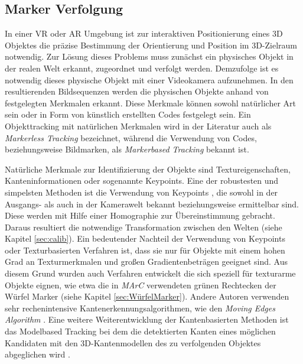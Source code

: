 \subsection{Marker Verfolgung} \label{sec:MarkerTracking}
In einer VR oder AR Umgebung ist zur interaktiven Positionierung eines 3D Objektes die präzise Bestimmung der Orientierung und Position im 3D-Zielraum notwendig. Zur Lösung dieses Problems muss zunächst ein physisches Objekt in der realen Welt erkannt, zugeordnet und verfolgt werden. Demzufolge ist es notwendig dieses physische Objekt mit einer Videokamera aufzunehmen. In den resultierenden Bildsequenzen werden die physischen Objekte anhand von festgelegten Merkmalen erkannt. Diese Merkmale können sowohl natürlicher Art sein oder in Form von künstlich erstellten Codes festgelegt sein. Ein Objekttracking mit natürlichen Merkmalen wird in der Literatur auch als \textit{Markerless Tracking} bezeichnet, während die Verwendung von Codes, beziehungsweise Bildmarken, als \textit{Markerbased Tracking} bekannt ist.

Natürliche Merkmale zur Identifizierung der Objekte sind Textureigenschaften, Kanteninformationen oder sogenannte Keypoints. Eine der robustesten und simpelsten Methoden ist die Verwendung von Keypoints \cite{article:MarkerLessBarandiaran2010}\cite{article:MarkerLessWagner:}\cite{article:MarkerLessComport}\cite{article:MarkerLessLowe}, die sowohl in der Ausgangs- als auch in der Kamerawelt bekannt beziehungsweise ermittelbar sind. Diese werden mit Hilfe einer Homographie zur Übereinstimmung gebracht. Daraus resultiert die notwendige Transformation zwischen den Welten (siehe Kapitel \ref{sec:calib}). Ein bedeutender Nachteil der Verwendung von Keypoints oder Texturbasierten Verfahren ist, dass sie nur für Objekte mit einem hohen Grad an Texturmerkmalen und großen Gradientenbeträgen geeignet sind. Aus diesem Grund wurden auch Verfahren \cite{article:MarkerLessStrucktHinterstoisser}\cite{article:MarkerLessStrucktDamen}\cite{article:MarkerLessStrucktPark} entwickelt die sich speziell für texturarme Objekte eignen, wie etwa die in \textit{MArC} verwendeten grünen Rechtecken der Würfel Marker (siehe Kapitel \ref{sec:WürfelMarker}). Andere Autoren verwenden sehr rechenintensive Kantenerkennungsalgorithmen, wie den \textit{Moving Edges Algorithm} \cite{article:MarkerLessEdgeMarchand}. Eine weitere Weiterentwicklung der Kantenbasierten Methoden ist das Modelbased Tracking bei dem die detektierten Kanten eines möglichen Kandidaten mit den 3D-Kantenmodellen des zu verfolgenden Objektes abgeglichen wird \cite{article:MarkerLessModellVacchetti}\cite{article:MarkerLessEdgeAlvarez}\cite{article:MarkerLessEdgeWu}\cite{article:MarkerLessBlasko}.

